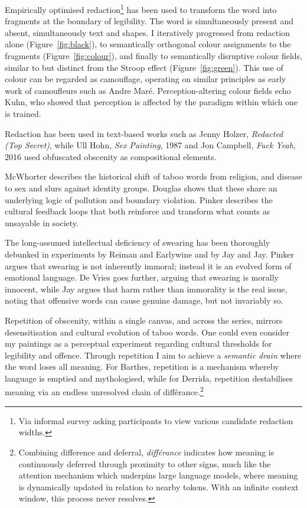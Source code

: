 \documentclass[12pt]{article}
\begin{document}
Empirically optimised redaction\footnote{Via informal survey asking
  participants to view various candidate redaction widths.} has been
used to transform the word into fragments at the boundary of
legibility. The word is simultaneously present and absent,
simultaneously text and shapes. I iteratively progressed from
redaction alone (Figure~\ref{fig:black}), to semantically orthogonal
colour assignments to the fragments (Figure~\ref{fig:colour}), and
finally to semantically disruptive colour fields, similar to but
distinct from the Stroop effect\autocite{stroop1935studies}
(Figure~\ref{fig:green}). This use of colour can be regarded as
camouflage, operating on similar principles as early work of
camoufleurs such as Andre Mar\'e. Perception-altering colour fields
echo Kuhn, who showed that perception is affected by the paradigm
within which one is trained.\autocite{kuhn1970structure}

Redaction has been used in text-based works such as Jenny Holzer,
\emph{Redacted (Top Secret)}, while Ull Hohn, \emph{Sex Painting},
1987 and Jon Campbell, \emph{Fuck Yeah}, 2016 used obfuscated obscenity
as compositional elements.

McWhorter describes the historical shift of taboo words from religion,
and disease to sex and slurs against identity
groups.\autocite{mcwhorter2024nine} Douglas shows that these share an
underlying logic of pollution and boundary violation.\autocite{douglas1966purity}
Pinker describes the cultural feedback loops that both reinforce and
transform what counts as unsayable in society.\autocite{pinker2008seven}

The long-assumed intellectual deficiency of swearing has been
thoroughly debunked in experiments by Reiman and
Earlywine\autocite{reiman2022swearfluency} and by Jay and
Jay.\autocite{jay2015taboo} Pinker argues that
swearing is not inherently immoral; instead it is an evolved form of
emotional language.\autocite{pinker2017moral} De Vries goes further, arguing that swearing is
morally innocent,\autocite{devries2023swearing} while Jay argues that harm
rather than immorality is the real issue, noting that offensive words
can cause genuine damage, but not invariably so.\autocite{jay2009offensive}

Repetition of obscenity, within a single canvas, and across the series,
mirrors desensitisation and cultural evolution of taboo words. One
could even consider my paintings as a perceptual experiment regarding
cultural thresholds for legibility and offence. Through repetition I
aim to achieve a \emph{semantic drain} where the word loses all
meaning. For Barthes, repetition is a mechanism whereby language is
emptied and mythologised,\autocite{barthes1957mythologies} while for
Derrida,\autocite{derrida1972dissemination} repetition destabilises
meaning via an endless unresolved chain of
diff\'erance.\footnote{Combining difference and deferral,
  \emph{diff\'erance} indicates how meaning is continuously deferred
  through proximity to other signs, much like the attention mechanism
  which underpins large language models, where meaning is dynamically
  updated in relation to nearby tokens. With an infinite context
  window, this process never resolves.}
\end{document}

